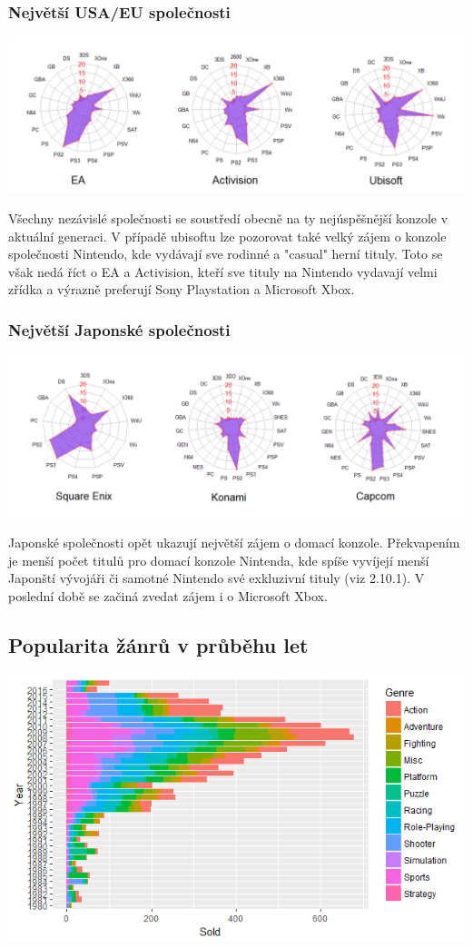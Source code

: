 \documentclass[a4paper,11pt]{article}
\begin{document}
\subsubsection{Největší USA/EU společnosti}
\includegraphics[scale=0.5]{EA}

Všechny nezávislé společnosti se soustředí obecně na ty nejúspěšnější konzole v aktuální generaci. V případě ubisoftu lze pozorovat také velký zájem o konzole společnosti Nintendo, kde vydávají sve rodinné a "casual" herní tituly. Toto se však nedá říct o EA a Activision, kteří sve tituly na Nintendo vydavají velmi zřídka a výrazně preferují Sony Playstation a Microsoft Xbox.

\subsubsection{Největší Japonské společnosti}
\includegraphics[scale=0.5]{capcom}

Japonské společnosti opět ukazují největší zájem o domací konzole. Překvapením je menší počet titulů pro domací konzole Nintenda, kde spíše vyvíjejí menší Japonští vývojáři či samotné Nintendo své exkluzivní tituly (viz 2.10.1). V poslední době se začiná zvedat zájem i o Microsoft Xbox.


\newpage

\subsection{Popularita žánrů v průběhu let}
\includegraphics[scale=0.8]{Rplot19}
\end{document}
